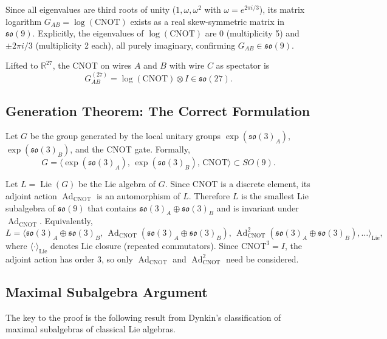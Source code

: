 \documentclass[12pt,a4paper]{article}
\newcommand{\Ad}{\operatorname{Ad}}
\newcommand{\Lie}{\operatorname{Lie}}
\begin{document}
Since all eigenvalues are third roots of unity ($1,\omega,\omega^2$ with
$\omega = e^{2\pi i/3}$), its matrix logarithm
$G_{AB} = \log(\text{CNOT})$ exists as a real skew-symmetric matrix in
$\mathfrak{so}(9)$. Explicitly, the eigenvalues of $\log(\text{CNOT})$
are $0$ (multiplicity 5) and $\pm 2\pi i/3$ (multiplicity 2 each), all
purely imaginary, confirming $G_{AB} \in \mathfrak{so}(9)$.

Lifted to $\mathbb{R}^{27}$, the CNOT on wires $A$ and $B$ with wire $C$
as spectator is
\[
G_{AB}^{(27)} = \log(\text{CNOT}) \otimes I \in \mathfrak{so}(27).
\]

\subsection{Generation Theorem: The Correct Formulation}
\label{sec:groupformulation}

Let $G$ be the group generated by the local unitary groups
$\exp(\mathfrak{so}(3)_A)$, $\exp(\mathfrak{so}(3)_B)$, and the CNOT gate.
Formally,
\[
G = \langle \exp(\mathfrak{so}(3)_A),\,
\exp(\mathfrak{so}(3)_B),\, \text{CNOT} \rangle \subset SO(9).
\]

Let $L = \Lie(G)$ be the Lie algebra of $G$. Since $\text{CNOT}$ is a
discrete element, its adjoint action $\Ad_{\text{CNOT}}$ is an automorphism
of $L$. Therefore $L$ is the smallest Lie subalgebra of $\mathfrak{so}(9)$
that contains $\mathfrak{so}(3)_A \oplus \mathfrak{so}(3)_B$ and is
invariant under $\Ad_{\text{CNOT}}$. Equivalently,
\[
L = \big\langle \mathfrak{so}(3)_A \oplus \mathfrak{so}(3)_B,\,
\Ad_{\text{CNOT}}(\mathfrak{so}(3)_A \oplus \mathfrak{so}(3)_B),\,
\Ad_{\text{CNOT}}^2(\mathfrak{so}(3)_A \oplus \mathfrak{so}(3)_B),
\ldots \big\rangle_{\text{Lie}},
\]
where $\langle \cdot \rangle_{\text{Lie}}$ denotes Lie closure (repeated
commutators). Since $\text{CNOT}^3 = I$, the adjoint action has order 3,
so only $\Ad_{\text{CNOT}}$ and $\Ad_{\text{CNOT}}^2$ need be considered.

\subsection{Maximal Subalgebra Argument}

The key to the proof is the following result from Dynkin's classification
of maximal subalgebras of classical Lie algebras.
\end{document}

